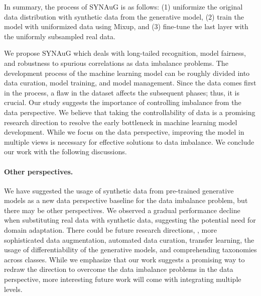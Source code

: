 In summary, the process of SYNAuG is as follows:
(1) uniformize the original data distribution with synthetic data from the generative model, (2) train the model with uniformized data using Mixup, and (3) fine-tune the last layer with the uniformly subsampled real data.




We propose SYNAuG which deals with long-tailed recognition, model fairness, and robustness to spurious correlations as data imbalance problems.
The development process of the machine learning model 
can be roughly divided into 
data curation, model training, and model management.
Since the data comes first in the process,
a flaw in the dataset affects the subsequent phases; thus, it is crucial.
Our study suggests the importance of controlling imbalance from the data perspective.
We believe that taking the controllability of data is a promising research direction to resolve the early bottleneck in machine learning model development. 
While we focus on the data perspective, improving the model in multiple views is necessary for effective solutions to data imbalance.
We conclude our work with the following discussions.

\paragraph{Other perspectives.}
We have suggested the usage of synthetic data from pre-trained generative models as a new data perspective baseline for the data imbalance problem, but there may be other perspectives.
We observed a gradual performance decline when substituting real data with synthetic data, suggesting the potential need for domain adaptation.
There could be future research directions, \eg, more sophisticated data augmentation, automated data curation, transfer learning, the usage of differentiability of the generative models, and comprehending taxonomies across classes.
While we emphasize that our work suggests a promising way to redraw the direction to overcome the data imbalance problems in the data perspective, more interesting future work will come with integrating multiple levels.

